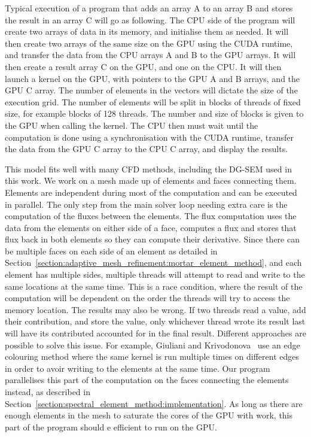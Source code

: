 Typical execution of a program that adds an array A to an array B and stores the result in an array
C will go as following. The CPU side of the program will create two arrays of data in its memory,
and initialise them as needed. It will then create two arrays of the same size on the GPU using the
CUDA runtime, and transfer the data from the CPU arrays A and B to the GPU arrays. It will then
create a result array C on the GPU, and one on the CPU. It will then launch a kernel on the GPU, 
with pointers to the GPU A and B arrays, and the GPU C array. The number of elements in the vectors
will dictate the size of the execution grid. The number of elements will be split in blocks of
threads of fixed size, for example blocks of 128 threads. The number and size of blocks is given to
the GPU when calling the kernel. The CPU then must wait until the computation is done using a
synchronisation with the CUDA runtime, transfer the data from the GPU C array to the CPU C array,
and display the results. 

This model fits well with many CFD methods, including the DG-SEM used in this work. We work on a
mesh made up of elements and faces connecting them. Elements are independent during most of the
computation and can be executed in parallel. The only step from the main solver loop needing extra
care is the computation of the fluxes between the elements. The flux computation uses the data from
the elements on either side of a face, computes a flux and stores that flux back in both elements so
they can compute their derivative. Since there can be multiple faces on each side of an element as
detailed in Section~\ref{section:adaptive_mesh_refinement:mortar_element_method}, and each element
has multiple sides, multiple threads will attempt to read and write to the same locations at the
same time. This is a race condition, where the result of the computation will be dependent on the
order the threads will try to access the memory location. The results may also be wrong. If
two threads read a value, add their contribution, and store the value, only whichever thread wrote
its result last will have its contributed accounted for in the final result. Different approaches
are possible to solve this issue. For example, Giuliani and Krivodonova~\cite{Giuliani2019} use an
edge colouring method where the same kernel is run multiple times on different edges in order to
avoir writing to the elements at the same time. Our program parallelises this part of the
computation on the faces connecting the elements instead, as described in
Section~\ref{section:spectral_element_method:implementation}. As long as there are enough elements
in the mesh to saturate the cores of the GPU with work, this part of the program should e efficient
to run on the GPU.

